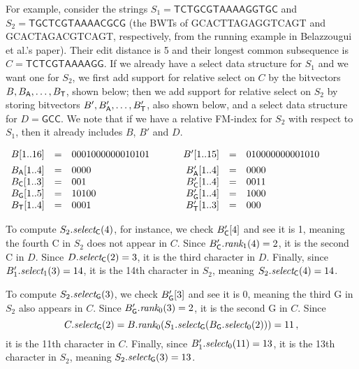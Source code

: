 For example, consider the strings \(S_1 = \mathsf{TCTGCGTAAAAGGTGC}\) and \(S_2 = \mathsf{TGCTCGTAAAACGCG}\) (the BWTs of {\sf GCACTTAGAGGTCAGT} and {\sf GCACTAGACGTCAGT}, respectively, from the running example in Belazzougui et al.'s paper).  Their edit distance is 5 and their longest common subsequence is \(C = \mathsf{TCTCGTAAAAGG}\).  If we already have a select data structure for $S_1$ and we want one for $S_2$, we first add support for relative select on $C$ by the bitvectors \(B, B_{\sf A}, \ldots, B_{\sf T}\), shown below; then we add support for relative select on $S_2$ by storing bitvectors \(B', B_{\sf A}', \ldots, B_{\sf T}'\), also shown below, and a select data structure for \(D = \mathsf{GCC}\).  We note that if we have a relative FM-index for $S_2$ with respect to $S_1$, then it already includes $B$, $B'$ and $D$.

\begin{center}
$\begin{array}{lcl@{\hspace{8ex}}rcl}
B [1..16] & = & 0001000000010101 & B' [1..15] & = & 010000000001010\\[1ex]
B_{\sf A} [1..4] & = & 0000 & B_{\sf A}' [1..4] & = & 0000\\
B_{\sf C} [1..3] & = & 001 & B_{\sf C}' [1..4] & = & 0011\\
B_{\sf G} [1..5] & = & 10100 & B_{\sf G}' [1..4] & = & 1000\\
B_{\sf T} [1..4]  & = & 0001 & B_{\sf T}' [1..3] & = & 000
\end{array}$
\end{center}

To compute \(S_2.\textit{select}_{\sf C} (4)\), for instance, we check \(B_{\sf C}' [4]\) and see it is 1, meaning the fourth {\sf C} in $S_2$ does not appear in $C$.  Since \(B_{\sf C}'.\textit{rank}_1 (4) = 2\), it is the second {\sf C} in $D$.  Since \(D.\textit{select}_{\sf C} (2) = 3\), it is the third character in $D$.  Finally, since \(B_1'.\textit{select}_1 (3) = 14\), it is the 14th character in $S_2$, meaning \(S_2.\textit{select}_{\sf C} (4) = 14\).

To compute \(S_2.\textit{select}_{\sf G} (3)\), we check \(B_{\sf G}' [3]\) and see it is 0, meaning the third {\sf G} in $S_2$ also appears in $C$.  Since \(B_{\sf G}'.\textit{rank}_0 (3) = 2\), it is the second {\sf G} in $C$.  Since
\[C.\textit{select}_{\sf G} (2) = B.\textit{rank}_0 (S_1.\textit{select}_{\sf G} (B_{\sf G}.\textit{select}_0 (2))) = 11\,,\]
it is the 11th character in $C$.  Finally, since \(B_1'.\textit{select}_0 (11) = 13\), it is the 13th character in $S_2$, meaning \(S_2.\textit{select}_{\sf G} (3) = 13\).


